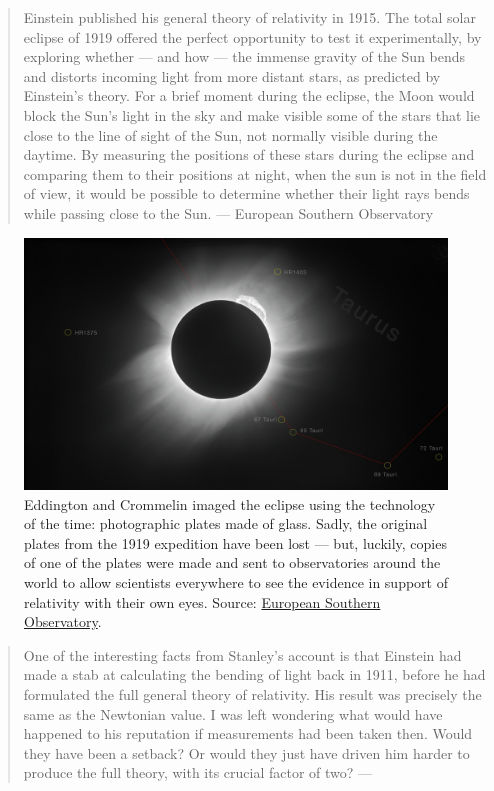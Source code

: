 \documentclass[
]{book}
\begin{document}
\begin{quote}
Einstein published his general theory of relativity in 1915. The total solar eclipse of 1919 offered the perfect opportunity to test it experimentally, by exploring whether --- and how --- the immense gravity of the Sun bends and distorts incoming light from more distant stars, as predicted by Einstein's theory. For a brief moment during the eclipse, the Moon would block the Sun's light in the sky and make visible some of the stars that lie close to the line of sight of the Sun, not normally visible during the daytime. By measuring the positions of these stars during the eclipse and comparing them to their positions at night, when the sun is not in the field of view, it would be possible to determine whether their light rays bends while passing close to the Sun. --- European Southern Observatory
\end{quote}

\begin{figure}

{\centering \includegraphics[width=1\linewidth]{Figures/solar_eclipse} 

}

\caption{Eddington and Crommelin imaged the eclipse using the technology of the time: photographic plates made of glass. Sadly, the original plates from the 1919 expedition have been lost --- but, luckily, copies of one of the plates were made and sent to observatories around the world to allow scientists everywhere to see the evidence in support of relativity with their own eyes. Source: \href{https://www.eso.org/public/images/potw1926a/}{European Southern Observatory}.}\label{fig:eddington-eclipse}
\end{figure}

\begin{quote}
One of the interesting facts from Stanley's account is that Einstein had made a stab at calculating the bending of light back in 1911, before he had formulated the full general theory of relativity. His result was precisely the same as the Newtonian value. I was left wondering what would have happened to his reputation if measurements had been taken then. Would they have been a setback? Or would they just have driven him harder to produce the full theory, with its crucial factor of two? --- \citep{coles2019einstein}
\end{quote}
\end{document}
